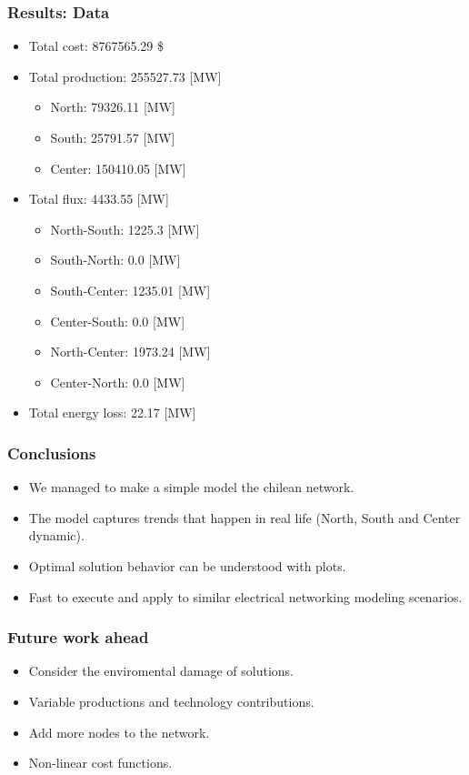\documentclass[
11pt, %
]{beamer}
\begin{document}
	\begin{frame}
		\frametitle{Results: Data}
		
		\begin{itemize}
			\item Total cost: 8767565.29 \$
			\item Total production: 255527.73 [MW]
			\begin{itemize}
				\item North: 79326.11 [MW]
				\item South: 25791.57 [MW]
				\item Center: 150410.05 [MW]
			\end{itemize}
			\item Total flux: 4433.55 [MW]
			\begin{itemize}
				\item North-South: 1225.3 [MW]
				\item South-North: 0.0 [MW]
				\item South-Center: 1235.01 [MW]
				\item Center-South: 0.0 [MW]
				\item North-Center: 1973.24 [MW]
				\item Center-North: 0.0 [MW]
			\end{itemize}
			\item Total energy loss: 22.17 [MW]
		\end{itemize}
		
	\end{frame}
	
	
	\begin{frame}
		\frametitle{Conclusions}
		\begin{itemize}
			\item We managed to make a simple model the chilean network.
			\item The model captures trends that happen in real life (North, South and Center dynamic).
			\item Optimal solution behavior can be understood with plots.
			\item Fast to execute and apply to similar electrical networking modeling scenarios.
			
		\end{itemize}
	\end{frame}	
	
	\begin{frame}
		\frametitle{Future work ahead}
		\begin{itemize}
			\item Consider the enviromental damage of solutions.
			\item Variable productions and technology contributions.
			\item Add more nodes to the network.
			\item Non-linear cost functions.
		\end{itemize}
	\end{frame}
		
\end{document}
